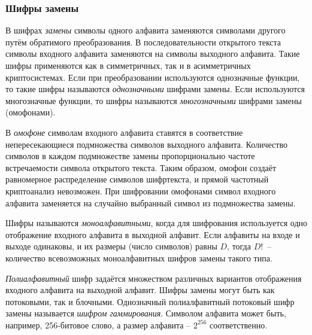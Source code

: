 \subsubsection{Шифры замены}

В шифрах \emph{замены} символы одного алфавита заменяются символами другого путём обратимого преобразования. В последовательности открытого текста символы входного алфавита заменяются на символы выходного алфавита. Такие шифры применяются как в симметричных, так и в асимметричных криптосистемах. Если при преобразовании используются однозначные функции, то такие шифры называются \emph{однозначными} шифрами замены. Если используются многозначные функции, то шифры называются \emph{многозначными} шифрами замены (омофонами).

В \emph{омофоне} символам входного алфавита ставятся в соответствие непересекающиеся подмножества символов выходного алфавита. Количество символов в каждом подмножестве замены пропорционально частоте встречаемости символа открытого текста. Таким образом, омофон создаёт равномерное распределение символов шифртекста, и прямой частотный криптоанализ невозможен. При шифровании омофонами символ входного алфавита заменяется на случайно выбранный символ из подмножества замены.

Шифры называются \emph{моноалфавитными}, когда для шифрования используется одно отображение входного алфавита в выходной алфавит. Если алфавиты на входе и выходе одинаковы, и их размеры (число символов) равны $D$, тогда $D!$~-- количество всевозможных моноалфавитных шифров замены такого типа.

\emph{Полиалфавитный} шифр задаётся множеством различных вариантов отображения входного алфавита на выходной алфавит. Шифры замены могут быть как потоковыми, так и блочными. Однозначный полиалфавитный потоковый шифр замены называется \emph{шифром гаммирования}. Символом алфавита может быть, например, 256-битовое слово, а размер алфавита – $2^{256}$ соответственно.
